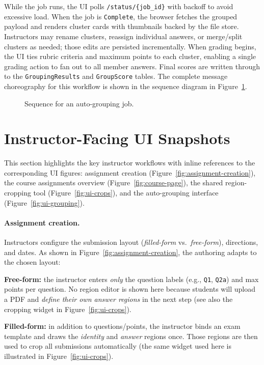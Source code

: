 \documentclass[ms,twoside,print]{nuthesis}
\begin{document}
While the job runs, the UI polls \texttt{/status/\{job\_id\}} with backoff to avoid excessive load. When the job is \texttt{Complete}, the browser fetches the grouped payload and renders cluster cards with thumbnails backed by the file store. Instructors may rename clusters, reassign individual answers, or merge/split clusters as needed; those edits are persisted incrementally. When grading begins, the UI ties rubric criteria and maximum points to each cluster, enabling a single grading action to fan out to all member answers. Final scores are written through to the \texttt{GroupingResults} and \texttt{GroupScore} tables. The complete message choreography for this workflow is shown in the sequence diagram in Figure~\ref{fig:sequence}.

\begin{figure}[htb]
  \centering
  
  \caption{Sequence for an auto-grouping job.}
  \label{fig:sequence}
\end{figure}

\section{Instructor-Facing UI Snapshots}
This section highlights the key instructor workflows with inline references to the corresponding UI figures: assignment creation (Figure~\ref{fig:assignment-creation}), the course assignments overview (Figure~\ref{fig:course-page}), the shared region-cropping tool (Figure~\ref{fig:ui-crops}), and the auto-grouping interface (Figure~\ref{fig:ui-grouping}).

\paragraph{Assignment creation.}
Instructors configure the submission layout (\emph{filled-form} vs.\ \emph{free-form}), directions, and dates. As shown in Figure~\ref{fig:assignment-creation}, the authoring adapts to the chosen layout: 
\begin{compactitem}
  \item \textbf{Free-form:} the instructor enters \emph{only} the question labels (e.g., \texttt{Q1}, \texttt{Q2a}) and max points per question. No region editor is shown here because students will upload a PDF and \emph{define their own answer regions} in the next step (see also the cropping widget in Figure~\ref{fig:ui-crops}).
  \item \textbf{Filled-form:} in addition to questions/points, the instructor binds an exam template and draws the \emph{identity} and \emph{answer} regions once. Those regions are then used to crop all submissions automatically (the same widget used here is illustrated in Figure~\ref{fig:ui-crops}).
\end{compactitem}
\end{document}
